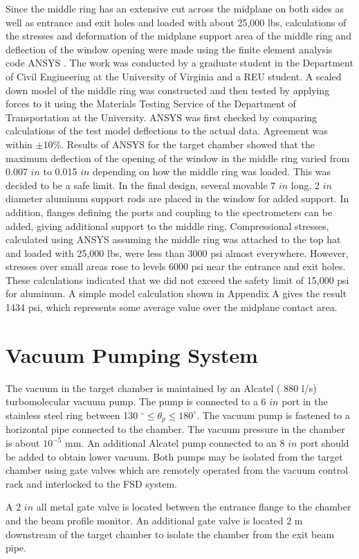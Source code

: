 {Since the middle ring has an extensive cut across the midplane on both sides as
well as
entrance and exit holes and loaded with about 25,000 lbs, calculations of the
stresses
 and deformation of  the
midplane support area of the middle ring and deflection of the window opening
were made using the finite element analysis code ANSYS . The work was conducted
by a graduate student in the Department of Civil Engineering at the
University of
Virginia and a REU student.  A scaled down model of the middle ring was
constructed and then tested by applying forces to it using the Materials Testing
Service of the Department of Transportation at the University. ANSYS was first
checked by comparing calculations of the test model deflections to the actual
data. Agreement was  within $\pm$10\%. Results of ANSYS for the target
chamber showed that the maximum deflection of the opening of the window in the
middle ring varied from 0.007 $in$ to 0.015 $in$ depending on how the
middle ring
was loaded. This was decided to be a safe limit. In the final design, several
movable
7 $in$ long, 2 $in$ diameter aluminum support rods are placed in the
window for added support. In addition, flanges defining the ports and
coupling to
the spectrometers can be added, giving additional support to the middle ring.
Compressional stresses, calculated using ANSYS assuming the middle ring was
attached to the
top hat and loaded with 25,000 lbs, were less than 3000 psi 
almost everywhere.
However, stresses over small areas rose to levels 6000 psi near the entrance
and exit holes. These calculations indicated that we did not exceed the safety
limit of 15,000 psi for aluminum. A simple model calculation shown in Appendix
A  gives the result 1434 psi, which represents some average value over the
midplane
contact area.

\section{Vacuum Pumping System}

The vacuum in the target chamber is maintained by an Alcatel ( 880 l/s)
 turbomolecular vacuum pump. The pump is connected to a 6 $in$ port in the
stainless steel ring between 130
 $^\circ \le \theta_p \le 180 ^\circ$. The vacuum pump is
fastened to a horizontal pipe connected to the chamber. The vacuum pressure in
the chamber is about $10^{-5}$ mm. An additional Alcatel pump connected
to an 8 $in$ port should be added to obtain lower vacuum. Both
pumps may be isolated
from the target chamber using gate valves which are remotely operated
from the vacuum control rack and interlocked to the FSD system.


A 2 $in$ all metal gate valve is located between the entrance flange to the
chamber and the beam profile monitor.   
 An additional gate valve is located 2 m downstream of the
 target chamber to isolate the chamber from the exit beam pipe.
}

